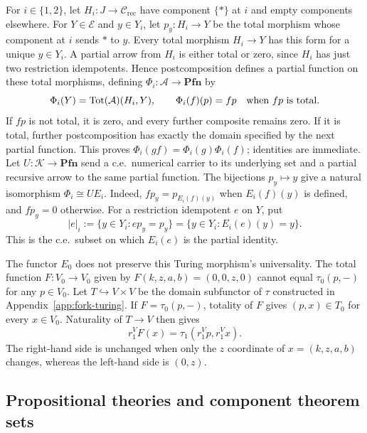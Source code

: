 \documentclass[11pt]{article}
\newcommand{\Pfn}{\mathbf{Pfn}}
\begin{document}
For $i\in\{1,2\}$, let $H_i:J\to\mathcal C_{\mathrm{rec}}$
have component $\{*\}$ at $i$ and empty components elsewhere.
For $Y\in\mathcal E$ and $y\in Y_i$, let $p_y:H_i\to Y$ be the total morphism
whose component at $i$ sends $*$ to $y$. Every total morphism
$H_i\to Y$ has this form for a unique $y\in Y_i$. A partial
arrow from $H_i$ is either total or zero, since $H_i$ has just
two restriction idempotents. Hence postcomposition defines a partial
function on these total morphisms, defining
$\Phi_i:\mathcal A\to\Pfn$ by
\[
 \Phi_i(Y)=\operatorname{Tot}(\mathcal A)(H_i,Y),\qquad
 \Phi_i(f)(p)=fp\quad\hbox{when }fp\hbox{ is total}.
\]
If $fp$ is not total, it is zero, and every further composite
remains zero. If it is total, further postcomposition has exactly
the domain specified by the next partial function. This proves
$\Phi_i(gf)=\Phi_i(g)\Phi_i(f)$; identities are immediate.
Let $U:\mathcal K\to\Pfn$ send a c.e.\ numerical carrier to its
underlying set and a partial recursive arrow to the same partial
function. The bijections $p_y\mapsto y$ give a natural isomorphism
$\Phi_i\cong U E_i$.
Indeed, $fp_y=p_{E_i(f)(y)}$ when $E_i(f)(y)$ is defined, and $fp_y=0$
otherwise.
For a restriction idempotent $e$ on $Y$, put
\begin{equation}\label{eq:probe-domain}
 |e|_i:=\{y\in Y_i:ep_y=p_y\}
       =\{y\in Y_i:E_i(e)(y)=y\}.
\end{equation}
This is the c.e.\ subset on which $E_i(e)$ is the partial identity.

The functor $E_0$ does not preserve this Turing morphism's universality.
The total function $F:V_0\to V_0$ given by
$F(k,z,a,b)=(0,0,z,0)$ cannot equal $\tau_0(p,-)$ for any $p\in V_0$.
Let $T\hookrightarrow V\times V$ be the domain subfunctor of
$\tau$ constructed in Appendix~\ref{app:fork-turing}.
If $F=\tau_0(p,-)$, totality of $F$ gives $(p,x)\in T_0$
for every $x\in V_0$. Naturality of $T\to V$ then gives
\[
 r_1^V F(x)=\tau_1(r_1^Vp,r_1^Vx).
\]
The right-hand side is unchanged when only the $z$ coordinate
of $x=(k,z,a,b)$ changes, whereas the left-hand side is $(0,z)$.

\subsection{Propositional theories and component theorem sets}
\end{document}
